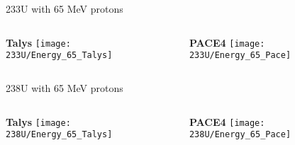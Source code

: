 \documentclass[10pt]{beamer}
\begin{document}
\begin{frame}{233U with 65 MeV protons}
	\begin{columns}
		\begin{column}{0.5\textwidth}
			\begin{overlayarea}{\textwidth}{\textheight}
				\centering	    
			   	\vspace{0.05\textheight}
			   	\textbf{Talys}
			   	\texttt{[image: 233U/Energy\_65\_Talys]}\\
			\end{overlayarea}
		\end{column}
		\begin{column}{0.5\textwidth}
			\begin{overlayarea}{\textwidth}{\textheight}
				\centering	    
			   	\vspace{0.05\textheight}
			   	\textbf{PACE4}
				\texttt{[image: 233U/Energy\_65\_Pace]}
			\end{overlayarea}
		\end{column}
	\end{columns}
\end{frame}

\begin{frame}{238U with 65 MeV protons}
	\begin{columns}
		\begin{column}{0.5\textwidth}
			\begin{overlayarea}{\textwidth}{\textheight}
				\centering	    
			   	\vspace{0.05\textheight}
			   	\textbf{Talys}
			   	\texttt{[image: 238U/Energy\_65\_Talys]}\\
			\end{overlayarea}
		\end{column}
		\begin{column}{0.5\textwidth}
			\begin{overlayarea}{\textwidth}{\textheight}
				\centering	    
			   	\vspace{0.05\textheight}
			   	\textbf{PACE4}
				\texttt{[image: 238U/Energy\_65\_Pace]}
			\end{overlayarea}
		\end{column}
	\end{columns}
\end{frame}
\end{document}

